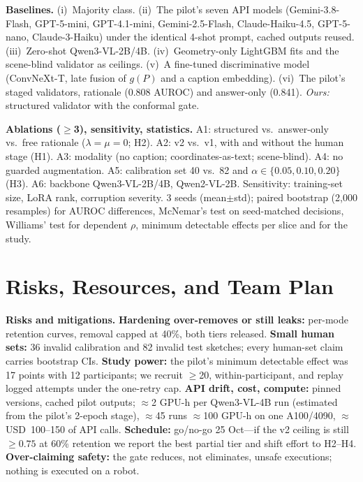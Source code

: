 \documentclass{article} %
\begin{document}
\textbf{Baselines.} (i)~Majority class. (ii)~The pilot's seven API models (Gemini-3.8-Flash, GPT-5-mini, GPT-4.1-mini, Gemini-2.5-Flash, Claude-Haiku-4.5, GPT-5-nano, Claude-3-Haiku) under the identical 4-shot prompt, cached outputs reused. (iii)~Zero-shot Qwen3-VL-2B/4B. (iv)~Geometry-only LightGBM fits and the scene-blind validator as ceilings. (v)~A fine-tuned discriminative model (ConvNeXt-T, late fusion of $g(P)$ and a caption embedding). (vi)~The pilot's staged validators, rationale (0.808 AUROC) and answer-only (0.841). \emph{Ours:} structured validator with the conformal gate.

\textbf{Ablations ($\ge$3), sensitivity, statistics.} A1: structured vs.\ answer-only vs.\ free rationale ($\lambda=\mu=0$; H2). A2: v2 vs.\ v1, with and without the human stage (H1). A3: modality (no caption; coordinates-as-text; scene-blind). A4: no guarded augmentation. A5: calibration set 40 vs.\ 82 and $\alpha\in\{0.05,0.10,0.20\}$ (H3). A6: backbone Qwen3-VL-2B/4B, Qwen2-VL-2B. Sensitivity: training-set size, LoRA rank, corruption severity. 3 seeds (mean$\pm$std); paired bootstrap (2,000 resamples) for AUROC differences, McNemar's test \citep{dietterich1998tests} on seed-matched decisions, Williams' test for dependent $\rho$, minimum detectable effects per slice and for the study.

\section{Risks, Resources, and Team Plan}
\label{sec:risks}
\textbf{Risks and mitigations.} \textbf{Hardening over-removes or still leaks:} per-mode retention curves, removal capped at 40\%, both tiers released. \textbf{Small human sets:} 36 invalid calibration and 82 invalid test sketches; every human-set claim carries bootstrap CIs. \textbf{Study power:} the pilot's minimum detectable effect was 17 points with 12 participants; we recruit $\ge$20, within-participant, and replay logged attempts under the one-retry cap. \textbf{API drift, cost, compute:} pinned versions, cached pilot outputs; $\approx$2 GPU-h per Qwen3-VL-4B run (estimated from the pilot's 2-epoch stage), $\approx$45 runs $\approx$100 GPU-h on one A100/4090, $\approx$USD~100--150 of API calls. \textbf{Schedule:} go/no-go 25 Oct---if the v2 ceiling is still $\ge0.75$ at 60\% retention we report the best partial tier and shift effort to H2--H4. \textbf{Over-claiming safety:} the gate reduces, not eliminates, unsafe executions; nothing is executed on a robot.
\end{document}
